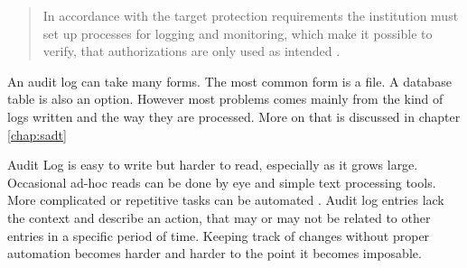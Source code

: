 \begin{quote}
In accordance with the target protection requirements the institution must set up processes for logging and monitoring, which make it possible to verify, that authorizations are only used as intended \citep{BaFinZAIT}.
\end{quote}




An audit log can take many forms. The most common form is a file. A database table is also an option. However most problems comes mainly from the kind of logs written and the way they are processed. More on that is discussed in chapter \ref{chap:sadt}

Audit Log is easy to write but harder to read, especially as it grows large. Occasional ad-hoc reads can be done by eye and simple text processing tools. More complicated or repetitive tasks can be automated \citep{AuditLog}. Audit log entries lack the context and describe an action, that may or may not be related to other entries in a specific period of time. Keeping track of changes without proper automation becomes harder and harder to the point it becomes imposable.

